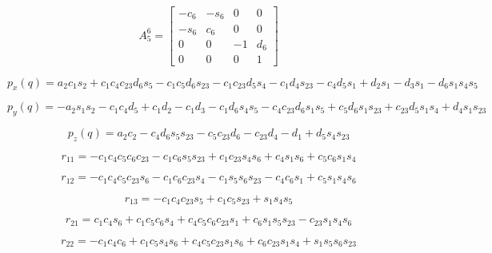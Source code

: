 \begin{equation}
A_{5}^{6} = \left[\begin{matrix}- c_{6} & - s_{6} & 0 & 0\\- s_{6} & c_{6} & 0 & 0\\0 & 0 & -1 & d_{6}\\0 & 0 & 0 & 1\end{matrix}\right]
\end{equation}

\begin{equation}
p_x(q) = a_{2} c_{1} s_{2} + c_{1} c_{4} c_{23} d_{6} s_{5} - c_{1} c_{5} d_{6} s_{23} - c_{1} c_{23} d_{5} s_{4} - c_{1} d_{4} s_{23} - c_{4} d_{5} s_{1} + d_{2} s_{1} - d_{3} s_{1} - d_{6} s_{1} s_{4} s_{5}
\end{equation}

\begin{equation}
p_y(q) = - a_{2} s_{1} s_{2} - c_{1} c_{4} d_{5} + c_{1} d_{2} - c_{1} d_{3} - c_{1} d_{6} s_{4} s_{5} - c_{4} c_{23} d_{6} s_{1} s_{5} + c_{5} d_{6} s_{1} s_{23} + c_{23} d_{5} s_{1} s_{4} + d_{4} s_{1} s_{23}
\end{equation}

\begin{equation}
p_z(q) = a_{2} c_{2} - c_{4} d_{6} s_{5} s_{23} - c_{5} c_{23} d_{6} - c_{23} d_{4} - d_{1} + d_{5} s_{4} s_{23}
\end{equation}

\begin{equation}
r_{11} = - c_{1} c_{4} c_{5} c_{6} c_{23} - c_{1} c_{6} s_{5} s_{23} + c_{1} c_{23} s_{4} s_{6} + c_{4} s_{1} s_{6} + c_{5} c_{6} s_{1} s_{4}
\end{equation}

\begin{equation}
r_{12} = - c_{1} c_{4} c_{5} c_{23} s_{6} - c_{1} c_{6} c_{23} s_{4} - c_{1} s_{5} s_{6} s_{23} - c_{4} c_{6} s_{1} + c_{5} s_{1} s_{4} s_{6}
\end{equation}

\begin{equation}
r_{13} = - c_{1} c_{4} c_{23} s_{5} + c_{1} c_{5} s_{23} + s_{1} s_{4} s_{5}
\end{equation}

\begin{equation}
r_{21} = c_{1} c_{4} s_{6} + c_{1} c_{5} c_{6} s_{4} + c_{4} c_{5} c_{6} c_{23} s_{1} + c_{6} s_{1} s_{5} s_{23} - c_{23} s_{1} s_{4} s_{6}
\end{equation}

\begin{equation}
r_{22} = - c_{1} c_{4} c_{6} + c_{1} c_{5} s_{4} s_{6} + c_{4} c_{5} c_{23} s_{1} s_{6} + c_{6} c_{23} s_{1} s_{4} + s_{1} s_{5} s_{6} s_{23}
\end{equation}

